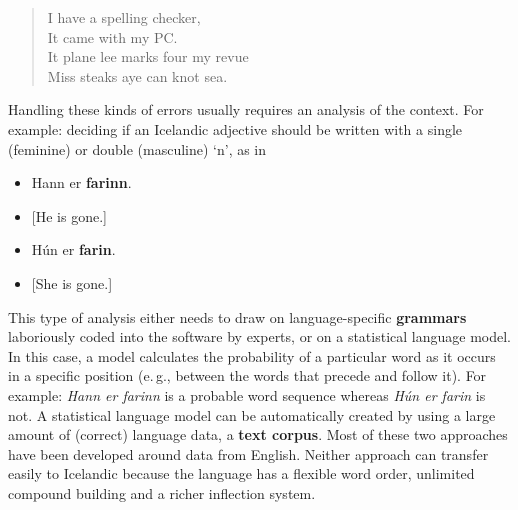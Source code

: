\documentclass{../../metanetpaper}
\begin{document}
\begin{multicols}{2}
\begin{quote}
  I have a spelling checker,\\
  It came with my PC.\\
  It plane lee marks four my revue\\
  Miss steaks aye can knot sea.
\end{quote}

Handling these kinds of errors usually requires an analysis of the context. For example: deciding if an Icelandic adjective should be written with a single (feminine) or double (masculine) ‘n’, as in

\begin{itemize}
\item Hann er \textbf{farinn}.
\item {[}He is gone.{]} 
\item Hún er \textbf{farin}.
\item {[}She is gone.{]}
\end{itemize}

This type of analysis either needs to draw on language-specific \textbf{grammars} laboriously coded into the software by experts, or on a statistical language model. In this case, a model calculates the probability of a particular word as it occurs in a specific position (e.\,g., between the words that precede and follow it). For example: \textit{Hann er farinn} is a probable word sequence whereas \textit{Hún er farin} is not. A statistical language model can be automatically created by using a large amount of (correct) language data, a \textbf{text corpus}. Most of these two approaches have been developed around data from English. Neither approach can transfer easily to Icelandic because the language has a flexible word order, unlimited compound building and a richer inflection system.



\end{multicols}
\end{document}
